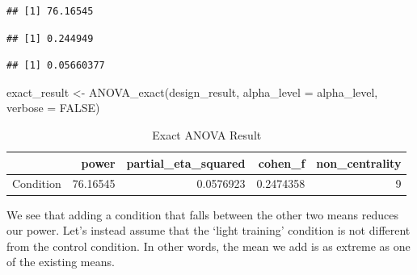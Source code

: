 \documentclass[
]{book}
\newenvironment{Shaded}{\begin{snugshade}}{\end{snugshade}}
\newcommand{\AttributeTok}[1]{\textcolor[rgb]{0.77,0.63,0.00}{#1}}
\newcommand{\ConstantTok}[1]{\textcolor[rgb]{0.00,0.00,0.00}{#1}}
\newcommand{\FunctionTok}[1]{\textcolor[rgb]{0.00,0.00,0.00}{#1}}
\newcommand{\NormalTok}[1]{#1}
\newcommand{\OtherTok}[1]{\textcolor[rgb]{0.56,0.35,0.01}{#1}}
\newcommand{\SpecialCharTok}[1]{\textcolor[rgb]{0.00,0.00,0.00}{#1}}
\begin{document}
\begin{verbatim}
## [1] 76.16545
\end{verbatim}

\begin{Shaded}
\end{Shaded}

\begin{verbatim}
## [1] 0.244949
\end{verbatim}

\begin{Shaded}
\end{Shaded}

\begin{verbatim}
## [1] 0.05660377
\end{verbatim}

\begin{Shaded}
\begin{Highlighting}[]
\NormalTok{exact\_result }\OtherTok{\textless{}{-}} \FunctionTok{ANOVA\_exact}\NormalTok{(design\_result,}
                            \AttributeTok{alpha\_level =}\NormalTok{ alpha\_level,}
                            \AttributeTok{verbose =} \ConstantTok{FALSE}\NormalTok{)}
\end{Highlighting}
\end{Shaded}

\begin{table}[!h]

\caption{\label{tab:unnamed-chunk-244}Exact ANOVA Result}
\centering
\begin{tabular}[t]{l|r|r|r|r}
\hline
  & power & partial\_eta\_squared & cohen\_f & non\_centrality\\
\hline
Condition & 76.16545 & 0.0576923 & 0.2474358 & 9\\
\hline
\end{tabular}
\end{table}

We see that adding a condition that falls between the other two means reduces our power. Let's instead assume that the `light training' condition is not different from the control condition. In other words, the mean we add is as extreme as one of the existing means.
\end{document}
